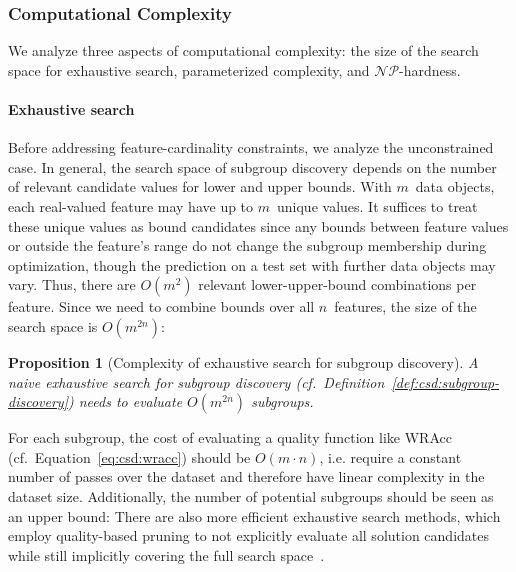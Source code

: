 \documentclass{article}
\newtheorem{proposition}{Proposition}
\theoremstyle{definition}
\begin{document}
\subsubsection{Computational Complexity}
\label{sec:csd:approach:cardinality:complexity}

We analyze three aspects of computational complexity:
the size of the search space for exhaustive search, parameterized complexity, and $\mathcal{NP}$-hardness.

\paragraph{Exhaustive search}

Before addressing feature-cardinality constraints, we analyze the unconstrained case.
In general, the search space of subgroup discovery depends on the number of relevant candidate values for lower and upper bounds.
With $m$~data objects, each real-valued feature may have up to $m$~unique values.
It suffices to treat these unique values as bound candidates since any bounds between feature values or outside the feature's range do not change the subgroup membership during optimization, though the prediction on a test set with further data objects may vary.
Thus, there are $O(m^2)$ relevant lower-upper-bound combinations per feature.
Since we need to combine bounds over all $n$~features, the size of the search space is $O(m^{2n})$:
%
\begin{proposition}[Complexity of exhaustive search for subgroup discovery]
	A naive exhaustive search for subgroup discovery (cf.~Definition~\ref{def:csd:subgroup-discovery}) needs to evaluate $O(m^{2n})$ subgroups.
	\label{prop:csd:complexity-unconstrained-exhaustive}
\end{proposition}
%
For each subgroup, the cost of evaluating a quality function like WRAcc (cf.~Equation~\ref{eq:csd:wracc}) should be $O(m \cdot n)$, i.e. require a constant number of passes over the dataset and therefore have linear complexity in the dataset size.
Additionally, the number of potential subgroups should be seen as an upper bound:
There are also more efficient exhaustive search methods, which employ quality-based pruning to not explicitly evaluate all solution candidates while still implicitly covering the full search space~\cite{atzmueller2015subgroup}.
\end{document}
